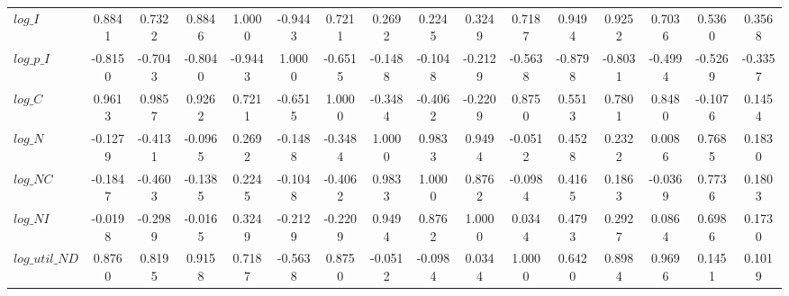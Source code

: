 \begin{center}
\begin{longtable}{lccccccccccccccc}
$log\_I         $	 & 	           0.8841	 & 	           0.7322	 & 	           0.8846	 & 	           1.0000	 & 	          -0.9443	 & 	           0.7211	 & 	           0.2692	 & 	           0.2245	 & 	           0.3249	 & 	           0.7187	 & 	           0.9494	 & 	           0.9252	 & 	           0.7036	 & 	           0.5360	 & 	           0.3568 \\ 
$log\_p\_I      $	 & 	          -0.8150	 & 	          -0.7043	 & 	          -0.8040	 & 	          -0.9443	 & 	           1.0000	 & 	          -0.6515	 & 	          -0.1488	 & 	          -0.1048	 & 	          -0.2129	 & 	          -0.5638	 & 	          -0.8798	 & 	          -0.8031	 & 	          -0.4994	 & 	          -0.5269	 & 	          -0.3357 \\ 
$log\_C         $	 & 	           0.9613	 & 	           0.9857	 & 	           0.9262	 & 	           0.7211	 & 	          -0.6515	 & 	           1.0000	 & 	          -0.3484	 & 	          -0.4062	 & 	          -0.2209	 & 	           0.8750	 & 	           0.5513	 & 	           0.7801	 & 	           0.8480	 & 	          -0.1076	 & 	           0.1454 \\ 
$log\_N         $	 & 	          -0.1279	 & 	          -0.4131	 & 	          -0.0965	 & 	           0.2692	 & 	          -0.1488	 & 	          -0.3484	 & 	           1.0000	 & 	           0.9833	 & 	           0.9494	 & 	          -0.0512	 & 	           0.4528	 & 	           0.2322	 & 	           0.0086	 & 	           0.7685	 & 	           0.1830 \\ 
$log\_NC        $	 & 	          -0.1847	 & 	          -0.4603	 & 	          -0.1385	 & 	           0.2245	 & 	          -0.1048	 & 	          -0.4062	 & 	           0.9833	 & 	           1.0000	 & 	           0.8762	 & 	          -0.0984	 & 	           0.4165	 & 	           0.1863	 & 	          -0.0369	 & 	           0.7736	 & 	           0.1803 \\ 
$log\_NI        $	 & 	          -0.0198	 & 	          -0.2989	 & 	          -0.0165	 & 	           0.3249	 & 	          -0.2129	 & 	          -0.2209	 & 	           0.9494	 & 	           0.8762	 & 	           1.0000	 & 	           0.0344	 & 	           0.4793	 & 	           0.2927	 & 	           0.0864	 & 	           0.6986	 & 	           0.1730 \\ 
$log\_util\_ND  $	 & 	           0.8760	 & 	           0.8195	 & 	           0.9158	 & 	           0.7187	 & 	          -0.5638	 & 	           0.8750	 & 	          -0.0512	 & 	          -0.0984	 & 	           0.0344	 & 	           1.0000	 & 	           0.6420	 & 	           0.8984	 & 	           0.9696	 & 	           0.1451	 & 	           0.1019 \\ 

\end{longtable}
\end{center}
